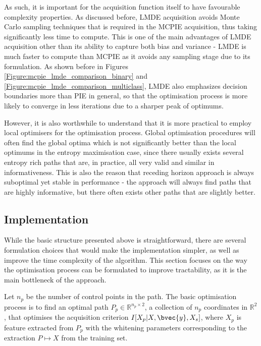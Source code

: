 			As such, it is important for the acquisition function itself to have favourable complexity properties. As discussed before, LMDE acquisition avoids Monte Carlo sampling techniques that is required in the MCPIE acquisition, thus taking significantly less time to compute. This is one of the main advantages of LMDE acquisition other than its ability to capture both bias and variance - LMDE is much faster to compute than MCPIE as it avoids any sampling stage due to its formulation. As shown before in Figures \ref{Figure:mcpie_lmde_comparison_binary} and \ref{Figure:mcpie_lmde_comparison_multiclass}, LMDE also emphasizes decision boundaries more than PIE in general, so that the optimisation process is more likely to converge in less iterations due to a sharper peak of optimums.
			
			However, it is also worthwhile to understand that it is more practical to employ local optimisers for the optimisation process. Global optimisation procedures will often find the global optima which is not significantly better than the local optimums in the entropy maximisation case, since there usually exists several entropy rich paths that are, in practice, all very valid and similar in informativeness. This is also the reason that receding horizon approach is always suboptimal yet stable in performance - the approach will always find paths that are highly informative, but there often exists other paths that are slightly better.
						
		\subsection{Implementation}

			While the basic structure presented above is straightforward, there are several formulation choices that would make the implementation simpler, as well as improve the time complexity of the algorithm. This section focuses on the way the optimisation process can be formulated to improve tractability, as it is the main bottleneck of the approach.
			
%			
%			
%			
	
			Let $n_{p}$ be the number of control points in the path. The basic optimisation process is to find an optimal path $P_{p} \in \mathbb{R}^{n_{p} \times 2}$, a collection of $n_{p}$ coordinates in $\mathbb{R}^{2}$, that optimises the acquisition criterion $I[X_{p} | X, \bvec{y}, X_{s}]$, where $X_{p}$ is feature extracted from $P_{p}$ with the whitening parameters corresponding to the extraction $P \mapsto X$ from the training set.
			
